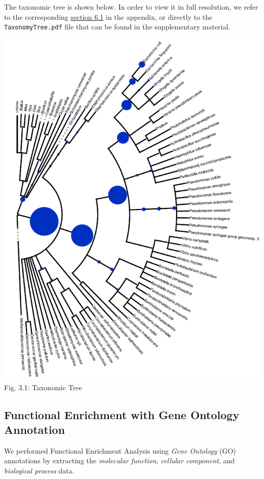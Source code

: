 \documentclass[10pt,twocolumn,letterpaper]{article}
\begin{document}
The taxonomic tree is shown below. In order to view it in full resolution, we refer to the corresponding \hyperref[sec:taxtree]{section 6.1} in the appendix, or directly to the \texttt{TaxonomyTree.pdf} file that can be found in the supplementary material.

\begin{center}
    \includegraphics[scale=0.45]{report/img/taxonomy_tree.png}\\
    \small{Fig. 3.1: Taxonomic Tree}
\end{center}

\subsection{Functional Enrichment with Gene Ontology Annotation}

We performed Functional Enrichment Analysis using \textit{Gene Ontology} (GO) annotations by extracting the \textit{molecular function}, \textit{cellular component}, and \textit{biological process} data.
\end{document}
